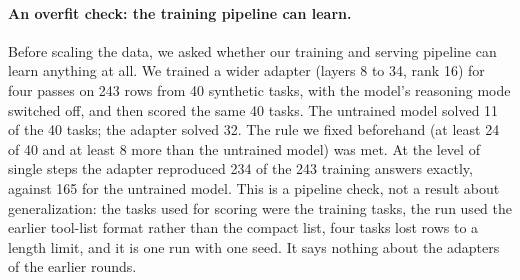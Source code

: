 \paragraph{An overfit check: the training pipeline can learn.} Before scaling the data, we asked whether our training and serving pipeline can learn anything at all. We trained a wider adapter (layers 8 to 34, rank 16) for four passes on 243 rows from 40 synthetic tasks, with the model's reasoning mode switched off, and then scored the same 40 tasks. The untrained model solved 11 of the 40 tasks; the adapter solved 32. The rule we fixed beforehand (at least 24 of 40 and at least 8 more than the untrained model) was met. At the level of single steps the adapter reproduced 234 of the 243 training answers exactly, against 165 for the untrained model. This is a pipeline check, not a result about generalization: the tasks used for scoring were the training tasks, the run used the earlier tool-list format rather than the compact list, four tasks lost rows to a length limit, and it is one run with one seed. It says nothing about the adapters of the earlier rounds.

